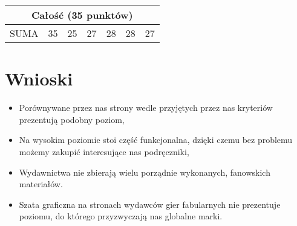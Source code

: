 \documentclass[a4paper,11pt]{article}
\begin{document}
\begin{tabular}{|l|c||c|c|c|c|c|}
	\multicolumn{7}{|c|}{\textbf{Całość (35 punktów)}} \\
	\hline
	SUMA & 35 & 25 & 27 & 28 & 28 & 27 \\ 
	\hline
	
\end{tabular}


\section {Wnioski}
\begin{itemize}
	\item Porównywane przez nas strony wedle przyjętych przez nas kryteriów prezentują podobny poziom,
	\item Na wysokim poziomie stoi część funkcjonalna, dzięki czemu bez problemu możemy zakupić interesujące nas podręczniki,
	\item Wydawnictwa nie zbierają wielu porządnie wykonanych, fanowskich materiałów.
	\item Szata graficzna na stronach wydawców gier fabularnych nie prezentuje poziomu, do którego przyzwyczają nas globalne marki.
\end{itemize} 
\end{document}
